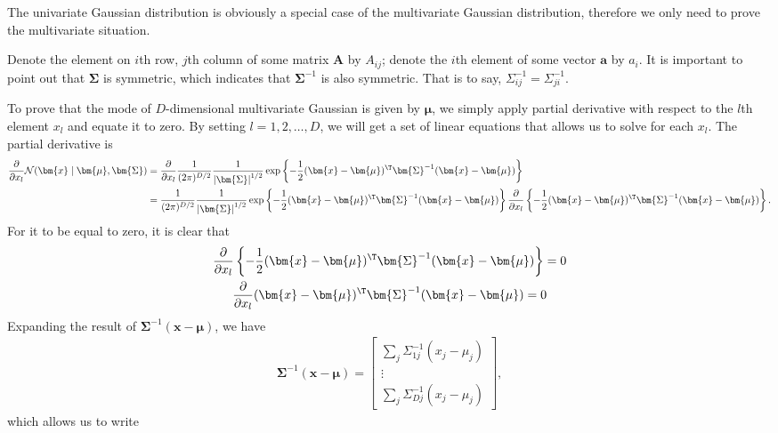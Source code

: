 \begin{answer}{}
	The univariate Gaussian distribution is obviously a special case of the multivariate Gaussian distribution, therefore we only need to prove the multivariate situation. 
	
	Denote the element on $i$th row, $j$th column of some matrix $\bm{A}$ by $A_{ij}$; denote the $i$th element of some vector $\bm{a}$ by $a_i$. It is important to point out that $\bm{\Sigma}$ is symmetric, which indicates that $\bm{\Sigma}^{-1}$ is also symmetric. That is to say, $\Sigma^{-1}_{ij} = \Sigma^{-1}_{ji}$. 
	
	To prove that the mode of $D$-dimensional multivariate Gaussian is given by $\bm{\mu}$, we simply apply partial derivative with respect to the $l$th element $x_l$ and equate it to zero. By setting $l = 1, 2,\ldots,D$, we will get a set of linear equations that allows us to solve for each $x_l$. The partial derivative is
	\begin{align}
		\frac{\partial}{\partial x_l} \mathcal{N}(\bm{x} \mid \bm{\mu}, \bm{\Sigma}) &= \frac{\partial}{\partial x_l}\frac{1}{(2\pi)^{D/2}} \frac{1}{\left\lvert \bm{\Sigma} \right\rvert^{1/2}} \exp\left\{ -\frac{1}{2}(\bm{x}-\bm{\mu})^\T\bm{\Sigma}^{-1}(\bm{x}-\bm{\mu}) \right\}\\
		&= \frac{1}{(2\pi)^{D/2}} \frac{1}{\left\lvert \bm{\Sigma} \right\rvert^{1/2}}\exp\left\{ -\frac{1}{2}(\bm{x}-\bm{\mu})^\T\bm{\Sigma}^{-1}(\bm{x}-\bm{\mu})\right\} \frac{\partial}{\partial x_l} \left\{ -\frac{1}{2}(\bm{x}-\bm{\mu})^\T\bm{\Sigma}^{-1}(\bm{x}-\bm{\mu})\right\}.
	\end{align}
	For it to be equal to zero, it is clear that
	\begin{gather}
		\frac{\partial}{\partial x_l} \left\{ -\frac{1}{2}(\bm{x}-\bm{\mu})^\T\bm{\Sigma}^{-1}(\bm{x}-\bm{\mu})\right\} = 0\\
		\frac{\partial}{\partial x_l} (\bm{x}-\bm{\mu})^\T\bm{\Sigma}^{-1}(\bm{x}-\bm{\mu}) = 0
	\end{gather}
	Expanding the result of $\bm{\Sigma}^{-1}(\bm{x}-\bm{\mu})$, we have
	\begin{align}
		\bm{\Sigma}^{-1}(\bm{x}-\bm{\mu}) = 
		\begin{bmatrix}
		\sum_j \Sigma_{1j}^{-1} \left(x_j - \mu_j\right)\\
		\vdots\\
		\sum_j \Sigma_{Dj}^{-1} \left(x_j - \mu_j\right)
		\end{bmatrix},
	\end{align}
	which allows us to write

\end{answer}
